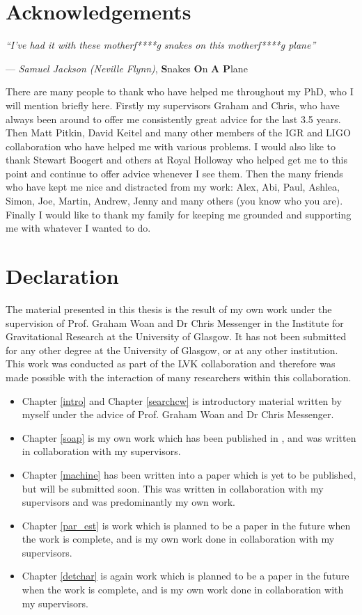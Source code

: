 \section*{Acknowledgements}

\epigraph{\textit{``I've had it with these motherf****g snakes on this motherf****g plane''}}{ --- \textit{Samuel Jackson (Neville Flynn)}, \textbf{S}nakes \textbf{O}n \textbf{A} \textbf{P}lane}

There are many people to thank who have helped me throughout my PhD, who I will mention briefly here.
Firstly my supervisors Graham and Chris, who have always been around to offer me consistently great advice for the last 3.5 years.
Then Matt Pitkin, David Keitel and many other members of the IGR and LIGO collaboration who have helped me with various problems.
I would also like to thank Stewart Boogert and others at Royal Holloway who helped get me to this point and continue to offer advice whenever I see them.
Then the many friends who have kept me nice and distracted from my work: Alex, Abi, Paul, Ashlea, Simon, Joe, Martin, Andrew, Jenny and many others (you know who you are).
Finally I would like to thank my family for keeping me grounded and supporting me with whatever I wanted to do.

\section*{Declaration}

The material presented in this thesis is the result of my own work under the
supervision of Prof. Graham Woan and Dr Chris Messenger in the Institute for
Gravitational Research at the University of Glasgow. It has not been submitted
for any other degree at the University of Glasgow, or at any other institution.
This work was conducted as part of the \gls{LVK} collaboration and therefore
was made possible with the interaction of many researchers within this
collaboration.

\begin{itemize}
	\item Chapter \ref{intro} and Chapter \ref{searchcw} is introductory material written by myself under the advice of Prof. Graham Woan and Dr Chris Messenger.
	\item Chapter \ref{soap} is my own work which has been published in \citep{bayley2019SOAPGeneralised}, and was written in collaboration with my supervisors.
	\item Chapter \ref{machine} has been written into a paper which is yet to be published, but will be submitted soon. This was written in collaboration with my supervisors and was predominantly my own work.
	\item Chapter \ref{par_est} is work which is planned to be a paper in the future when the work is complete, and is my own work done in collaboration with my supervisors.
	\item Chapter \ref{detchar} is again work which is planned to be a paper in the future when the work is complete, and is my own work done in collaboration with my supervisors.
\end{itemize}